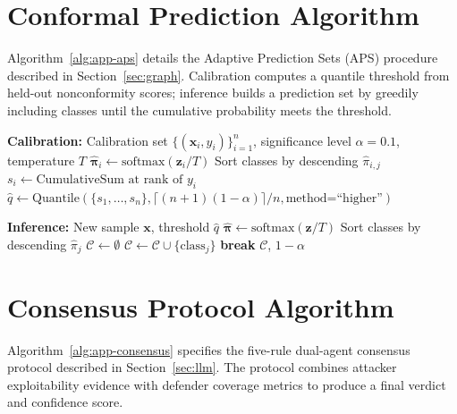 \section{Conformal Prediction Algorithm}
\label{app:conformal-alg}

Algorithm~\ref{alg:app-aps} details the Adaptive Prediction Sets (APS) procedure described in Section~\ref{sec:graph}. Calibration computes a quantile threshold from held-out nonconformity scores; inference builds a prediction set by greedily including classes until the cumulative probability meets the threshold.

\begin{algorithm}[H]
\caption{APS Calibration and Inference}
\label{alg:app-aps}
\begin{algorithmic}[1]
\Statex \textbf{Calibration:}
\Require Calibration set $\{(\mathbf{x}_i, y_i)\}_{i=1}^{n}$, significance level $\alpha = 0.1$, temperature $T$
    \State $\hat{\boldsymbol{\pi}}_i \gets \text{softmax}(\mathbf{z}_i / T)$ 
    \State Sort classes by descending $\hat{\pi}_{i,j}$
    \State $s_i \gets \text{CumulativeSum at rank of } y_i$
\EndFor
\State $\hat{q} \gets \text{Quantile}(\{s_1, \ldots, s_n\}, \lceil(n+1)(1-\alpha)\rceil / n, \text{method=``higher''})$

\Statex
\Statex \textbf{Inference:}
\Require New sample $\mathbf{x}$, threshold $\hat{q}$
\State $\hat{\boldsymbol{\pi}} \gets \text{softmax}(\mathbf{z} / T)$
\State Sort classes by descending $\hat{\pi}_j$
\State $\mathcal{C} \gets \emptyset$
    \State $\mathcal{C} \gets \mathcal{C} \cup \{\text{class}_j\}$
        \State \textbf{break}
    \EndIf
\EndFor
\State \Return $\mathcal{C}$, $1 - \alpha$
\end{algorithmic}
\end{algorithm}

\section{Consensus Protocol Algorithm}
\label{app:consensus-alg}

Algorithm~\ref{alg:app-consensus} specifies the five-rule dual-agent consensus protocol described in Section~\ref{sec:llm}. The protocol combines attacker exploitability evidence with defender coverage metrics to produce a final verdict and confidence score.

